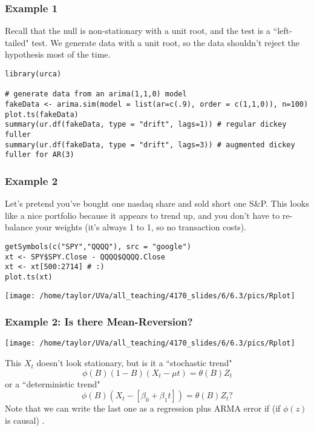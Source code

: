 \documentclass{beamer}
\begin{document}

\begin{frame}[fragile]
\frametitle{Example 1}

Recall that the null is non-stationary with a unit root, and the test is a ``left-tailed" test. We generate data with a unit root, so the data shouldn't reject the hypothesis most of the time. 
\begin{verbatim}
library(urca)

# generate data from an arima(1,1,0) model
fakeData <- arima.sim(model = list(ar=c(.9), order = c(1,1,0)), n=100)
plot.ts(fakeData)
summary(ur.df(fakeData, type = "drift", lags=1)) # regular dickey fuller
summary(ur.df(fakeData, type = "drift", lags=3)) # augmented dickey fuller for AR(3)
\end{verbatim}

\end{frame}


\begin{frame}[fragile]
\frametitle{Example 2}

Let's pretend you've bought one nasdaq share and sold short one S\&P. This looks like a nice portfolio because it appears to trend up, and you don't have to re-balance your weights (it's always 1 to 1, so no transaction costs). 

\begin{verbatim}
getSymbols(c("SPY","QQQQ"), src = "google")
xt <- SPY$SPY.Close - QQQQ$QQQQ.Close
xt <- xt[500:2714] # :)
plot.ts(xt)
\end{verbatim}

\texttt{[image: /home/taylor/UVa/all\_teaching/4170\_slides/6/6.3/pics/Rplot]}

\end{frame}


\begin{frame}[fragile]
\frametitle{Example 2: Is there Mean-Reversion?}

\texttt{[image: /home/taylor/UVa/all\_teaching/4170\_slides/6/6.3/pics/Rplot]}

This $X_t$ doesn't look stationary, but is it a ``stochastic trend"
\[
\phi(B)(1-B)(X_t-\mu t) = \theta(B)Z_t
\]
or a ``deterministic trend"
\[
\phi(B)(X_t - [\beta_0 + \beta_1 t]) = \theta(B) Z_t?
\]
Note that we can write the last one as a regression plus ARMA error if (if $\phi(z)$ is causal) .
\end{frame}
\end{document}
